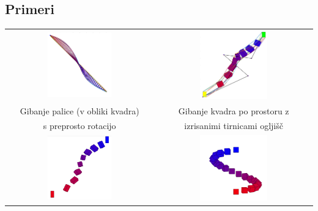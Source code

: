 \documentclass[12pt,a4paper,twoside]{article}
\theoremstyle{definition} %
\theoremstyle{plain} %
\numberwithin{equation}{section}  %
\begin{document}
\subsection{Primeri}

\begin{center}
\begin{tabular}{c c}
\includegraphics[width=0.45\textwidth]{slika1(dnkoblike)}
&
\includegraphics[width=0.45\textwidth]{slika2(tirnice)}
\\
Gibanje palice (v obliki kvadra) & Gibanje kvadra po prostoru z\\
s preprosto rotacijo & izrisanimi tirnicami ogljišč \\
\includegraphics[width=0.45\textwidth]{slika3}
&
\includegraphics[width=0.45\textwidth]{slika4}

\end{tabular}
\end{center}
\end{document}

